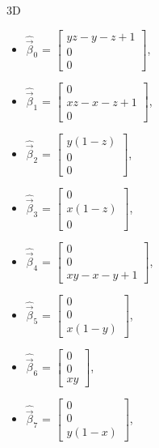 \begin{table}[!ht]
    3D
    \begin{multicols}{3}
    \begin{itemize}
        \item[] $\hat{\vec{\beta}}_0$ = $\begin{bmatrix}yz - y - z + 1 \\ 0 \\ 0\end{bmatrix}$, \\
        \item[] $\hat{\vec{\beta}}_1$ = $\begin{bmatrix}0 \\ xz - x - z + 1 \\ 0\end{bmatrix}$, \\
        \item[] $\hat{\vec{\beta}}_2$ = $\begin{bmatrix}y(1-z) \\ 0 \\ 0\end{bmatrix}$, \\
        \item[] $\hat{\vec{\beta}}_3$ = $\begin{bmatrix}0 \\ x(1-z) \\ 0\end{bmatrix}$, \\
        \item[] $\hat{\vec{\beta}}_4$ = $\begin{bmatrix}0 \\ 0 \\ xy - x - y +1\end{bmatrix}$, \\
        \item[] $\hat{\vec{\beta}}_5$ = $\begin{bmatrix}0 \\ 0 \\ x(1-y)\end{bmatrix}$, \\
        \item[] $\hat{\vec{\beta}}_6$ = $\begin{bmatrix}0 \\ 0 \\ xy\end{bmatrix}$, \\
        \item[] $\hat{\vec{\beta}}_7$ = $\begin{bmatrix}0 \\ 0 \\ y(1-x)\end{bmatrix}$, \\

\end{itemize}
\end{multicols}
\end{table}
